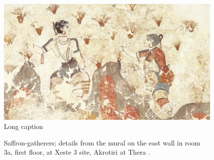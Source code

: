 \begin{figure}
    \includegraphics[width=\linewidth]{imgs/saffron_gatherers.jpg}
    \caption[Short caption to ToC]{Long caption}
    \label{fig:saffron1}
\end{figure}


\begin{figure}[!hbt]
    \centering
    \hfill
    \caption[Saffron-gatherers]{Saffron-gatherers; details from the mural on the east wall in room 3a, first floor, at Xeste 3 site, Akrotiri at Thera \autocite[152]{doumas_wall-paintings_1992}.}
    \label{fig:saffron2}
\end{figure}

